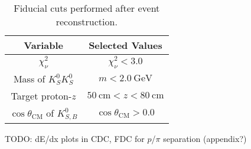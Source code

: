 \begin{table}
  \begin{center}
    \begin{tabular}{cc}\toprule
      Variable & Selected Values \\\midrule
      $\chi^2_\nu$ & $\chi^2_\nu < 3.0$ \\
      Mass of $K_S^0K_S^0$ & $ m < \SI{2.0}{\giga\electronvolt} $ \\
      Target proton-$z$ & $\SI{50}{\centi\meter} < z < \SI{80}{\centi\meter}$ \\
      $\cos\theta_{\text{CM}}$ of $K_{S,B}^0$ & $ \cos\theta_{\text{CM}} > 0.0 $ \\\bottomrule
    \end{tabular}
    \caption{Fiducial cuts performed after event reconstruction.}\label{tab:fiducial-cuts}
  \end{center}
\end{table}

{\color{red}TODO: dE/dx plots in CDC, FDC for $p$/$\pi$ separation (appendix?)}
